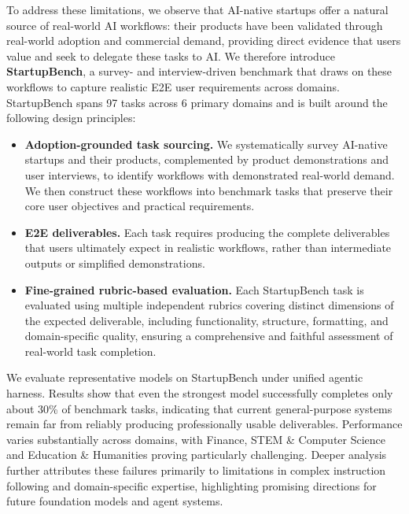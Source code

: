 To address these limitations, we observe that AI-native startups offer a natural source of real-world AI workflows: their products have been validated through real-world adoption and commercial demand, providing direct evidence that users value and seek to delegate these tasks to AI. We therefore introduce \textbf{StartupBench}, a survey- and interview-driven benchmark that draws on these workflows to capture realistic E2E user requirements across domains. StartupBench spans 97 tasks across 6 primary domains and is built around the following design principles:


\begin{itemize}
\item \textbf{Adoption-grounded task sourcing.} We systematically survey AI-native startups and their products, complemented by product demonstrations and user interviews, to identify workflows with demonstrated real-world demand. We then construct these workflows into benchmark tasks that preserve their core user objectives and practical requirements.


\item \textbf{E2E deliverables.} Each task requires producing the complete deliverables that users ultimately expect in realistic workflows, rather than intermediate outputs or simplified demonstrations.

\item \textbf{Fine-grained rubric-based evaluation.} Each StartupBench task is evaluated using multiple independent rubrics covering distinct dimensions of the expected deliverable, including functionality, structure, formatting, and domain-specific quality, ensuring a comprehensive and faithful assessment of real-world task completion.

\end{itemize}



We evaluate representative models on StartupBench under  unified agentic harness. Results show that even the strongest model successfully completes only about 30\% of benchmark tasks, indicating that current general-purpose systems remain far from reliably producing professionally usable deliverables. Performance varies substantially across domains, with Finance, STEM \& Computer Science and Education \& Humanities proving particularly challenging. Deeper analysis further attributes these failures primarily to  limitations in complex instruction following and domain-specific expertise, highlighting promising directions for future foundation models and agent systems.



